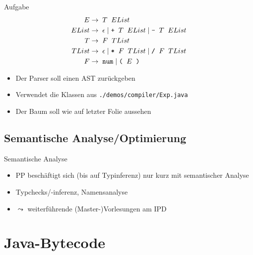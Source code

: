 \documentclass{beamer}
\begin{document}
\begin{frame}{Aufgabe}
	\footnotesize
	\begin{align*}
		E     \to & \;\; T \;\; EList\\
		EList \to & \;\; \epsilon \mid \textrm{\texttt{+}} \;\; T \;\; EList \mid \textrm{\texttt{-}} \;\; T \;\; EList\\
		T     \to & \;\; F \;\; TList\\
		TList \to & \;\; \epsilon \mid \textrm{\texttt{*}} \;\; F \;\; TList \mid \textrm{\texttt{/}} \;\; F \;\; TList\\
		F \to & \;\; \textrm{\texttt{num}} \; | \; \textrm{\texttt{(}} \;\; E \;\; \textrm{\texttt{)}}
	\end{align*}
	\begin{itemize}
            \item Der Parser soll einen AST zurückgeben
		\item Verwendet die Klassen aus \texttt{./demos/compiler/Exp.java}
            \item Der Baum soll wie auf letzter Folie aussehen
	\end{itemize}
\end{frame}

\subsection{Semantische Analyse/Optimierung}

\begin{frame}{Semantische Analyse}
	\begin{itemize}
		\item PP beschäftigt sich (bis auf Typinferenz) nur kurz mit semantischer Analyse
		\item Typchecks/-inferenz, Namensanalyse
		\item $\leadsto$ weiterführende (Master-)Vorlesungen am IPD
	\end{itemize}
\end{frame}

\section{Java-Bytecode}
\end{document}
